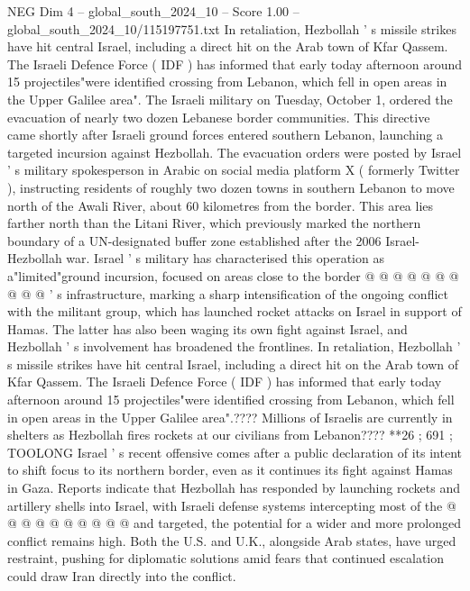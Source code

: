 \begin{textsample}{NEG Dim 4 – global\_south\_2024\_10 – Score 1.00 – global\_south\_2024\_10/115197751.txt}  \label{ex:f4_neg_072}
In retaliation, Hezbollah ' s missile strikes have hit central Israel, including a direct hit on the Arab town of Kfar Qassem.
The Israeli Defence Force ( IDF ) has informed that early today afternoon around 15 projectiles"were identified crossing from Lebanon, which fell in open areas in the Upper Galilee area".
The Israeli military on Tuesday, October 1, ordered the evacuation of nearly two dozen Lebanese border communities.
This directive came shortly after Israeli ground forces entered southern Lebanon, launching a targeted incursion against Hezbollah.
The evacuation orders were posted by Israel ' s military spokesperson in Arabic on social media platform X ( formerly Twitter ), instructing residents of roughly two dozen towns in southern Lebanon to move north of the Awali River, about 60 kilometres from the border.
This area lies farther north than the Litani River, which previously marked the northern boundary of a UN-designated buffer zone established after the 2006 Israel-Hezbollah war.
Israel ' s military has characterised this operation as a"limited"ground incursion, focused on areas close to the border @ @ @ @ @ @ @ @ @ @ ' s infrastructure, marking a sharp intensification of the ongoing conflict with the militant group, which has launched rocket attacks on Israel in support of Hamas.
The latter has also been waging its own fight against Israel, and Hezbollah ' s involvement has broadened the frontlines.
In retaliation, Hezbollah ' s missile strikes have hit central Israel, including a direct hit on the Arab town of Kfar Qassem.
The Israeli Defence Force ( IDF ) has informed that early today afternoon around 15 projectiles"were identified crossing from Lebanon, which fell in open areas in the Upper Galilee area".????
Millions of Israelis are currently in shelters as Hezbollah fires rockets at our civilians from Lebanon???? **26 ; 691 ; TOOLONG Israel ' s recent offensive comes after a public declaration of its intent to shift focus to its northern border, even as it continues its fight against Hamas in Gaza.
Reports indicate that Hezbollah has responded by launching rockets and artillery shells into Israel, with Israeli defense systems intercepting most of the @ @ @ @ @ @ @ @ @ @ and targeted, the potential for a wider and more prolonged conflict remains high.
Both the U.S. and U.K., alongside Arab states, have urged restraint, pushing for diplomatic solutions amid fears that continued escalation could draw Iran directly into the conflict.

\end{textsample}
